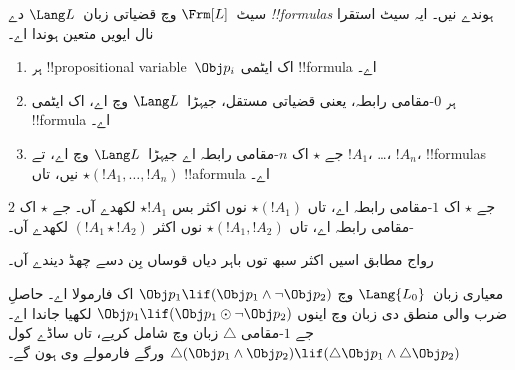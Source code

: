 \documentclass[../../../include/open-logic-section]{subfiles}
\begin{document}


\begin{defn}[فارمولا]
سیٹ~$\Frm[L]$ وچ قضیاتی زبان~$\Lang L$ دے \emph{!!{formula}s}
ہوندے نیں۔ ایہ سیٹ استقرا نال ایویں متعین ہوندا اے۔
\begin{enumerate}
\item ہر !!{propositional variable}~$\Obj p_i$ اک ایٹمی
  !!{formula} اے۔
\item ہر $0$-مقامی رابطہ، یعنی قضیاتی مستقل، جیہڑا~$\Lang L$
  وچ اے، اک ایٹمی !!{formula} اے۔
\item جے $\star$ اک $n$-مقامی رابطہ اے جیہڑا~$\Lang L$ وچ اے، تے $!A_1$،
\dots، $!A_n$، !!{formula}s نیں، تاں $\star(!A_1, \dots, !A_n)$
!!a{formula} اے۔
\end{enumerate}
جے $\star$ اک $1$-مقامی رابطہ اے، تاں $\star(!A_1)$ نوں
اکثر بس $\star !A_1$ لکھدے آں۔ جے $\star$ اک $2$-مقامی
رابطہ اے، تاں $\star(!A_1,!A_2)$ نوں اکثر $(!A_1 \star !A_2)$
لکھدے آں۔
\end{defn}

رواج مطابق اسیں اکثر سبھ توں باہر دیاں قوساں بِن دسے چھڈ
دیندے آں۔

\begin{ex}
  معیاری زبان~$\Lang{L_0}$ وچ $\Obj p_1 \lif (\Obj p_1
  \land \lnot \Obj p_2)$ اک فارمولا اے۔ حاصلِ ضرب والی منطق
  دی زبان وچ اینوں $\Obj p_1 \lif (\Obj p_1 \odot
  \lnot \Obj p_2)$ لکھیا جاندا اے۔ جے $1$-مقامی $\triangle$
  زبان وچ شامل کریے، تاں ساڈے کول $\triangle (\Obj p_1
  \land \Obj p_2) \lif (\triangle \Obj p_1 \land \triangle \Obj p_2)$
  ورگے فارمولے وی ہون گے۔
\end{ex}
\end{document}
